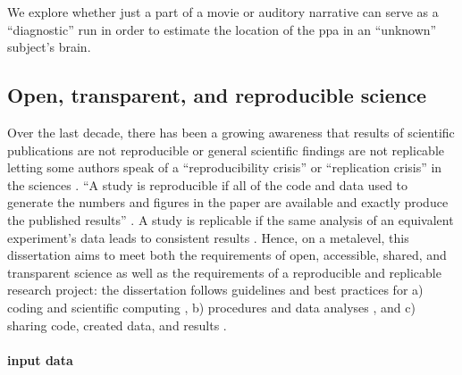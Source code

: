 %
We explore whether just a part of a movie or auditory narrative can serve as a
``diagnostic'' run in order to estimate the location of the \ac{ppa} in an
``unknown'' subject's brain.


\subsection{Open, transparent, and reproducible science}

Over the last decade, there has been a growing awareness that results of
scientific publications are not reproducible or general scientific findings are
not replicable letting some authors speak of a ``reproducibility crisis'' or
``replication crisis'' in the sciences \citep{baker2016reproducibility,
plesser2018reproducibility, stupple2019reproducibility, nosek2022replicability}.
``A study is reproducible if all of the code and data used to generate the
numbers and figures in the paper are available and exactly produce the published
results'' \citep{leek2017most}.
A study is replicable if the same analysis of an equivalent experiment's data
leads to consistent results \citep{dubois2016building, leek2017most}.
%
Hence, on a metalevel, this dissertation aims to meet both the requirements of
open, accessible, shared, and transparent science \citep{watson2015will,
fecher2014open} as well as the requirements of a reproducible and replicable
research project:
%
the dissertation follows guidelines and best practices for a) coding and
scientific computing \citep{wilson2014best}, b) procedures and data analyses
\citep{nichols2017best, poldrack2017scanning, poldrack2019establishment}, and c)
sharing code, created data, and results \citep{eglen2017toward, nichols2017best,
pernet2015improving}.


\paragraph{input data}


